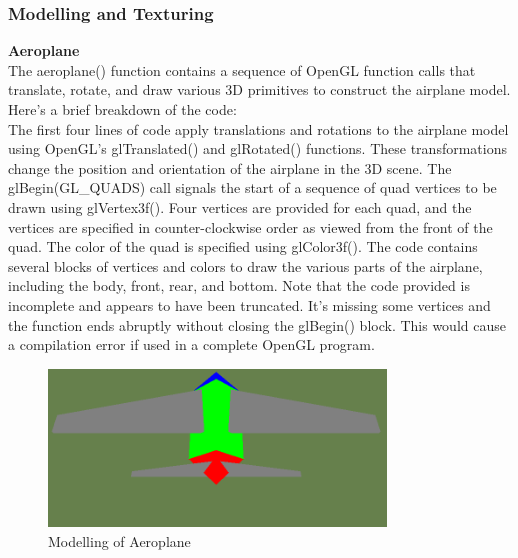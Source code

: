 \documentclass[12pt,a4]{article}
\begin{document}
\subsubsection{Modelling and Texturing}
{\textbf{\Large{Aeroplane}}\\
The aeroplane() function contains a sequence of OpenGL function calls that translate, rotate, and draw various 3D primitives to construct the airplane model. Here's a brief breakdown of the code:\\

The first four lines of code apply translations and rotations to the airplane model using OpenGL's glTranslated() and glRotated() functions. These transformations change the position and orientation of the airplane in the 3D scene.
The glBegin(GL\_QUADS) call signals the start of a sequence of quad vertices to be drawn using glVertex3f(). Four vertices are provided for each quad, and the vertices are specified in counter-clockwise order as viewed from the front of the quad. The color of the quad is specified using glColor3f().
The code contains several blocks of vertices and colors to draw the various parts of the airplane, including the body, front, rear, and bottom.
Note that the code provided is incomplete and appears to have been truncated. It's missing some vertices and the function ends abruptly without closing the glBegin() block. This would cause a compilation error if used in a complete OpenGL program.\\
\begin{figure}[h]
    \centering
    \includegraphics[width=0.8\textwidth]{Screenshot(40).png}
    \caption{Modelling of Aeroplane}
\end{figure}
 \\

}
\end{document}

